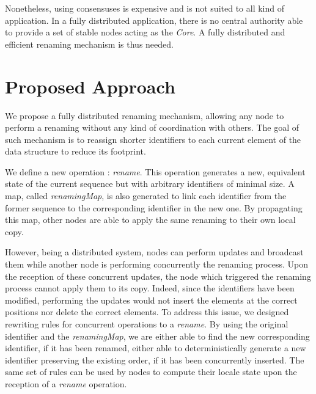 \documentclass[sigplan]{acmart}
\begin{document}
Nonetheless, using consensuses is expensive and is not suited to all kind of application. In a fully distributed application, there is no central authority able to provide a set of stable nodes acting as the \emph{Core}. A fully distributed and efficient renaming mechanism is thus needed.

\section{Proposed Approach}


We propose a fully distributed renaming mechanism, allowing any node to perform a renaming without any kind of coordination with others.
The goal of such mechanism is to reassign shorter identifiers to each current element of the data structure to reduce its footprint.

We define a new operation : \emph{rename}.
This operation generates a new, equivalent state of the current sequence but with arbitrary identifiers of minimal size.
A map, called \emph{renamingMap}, is also generated to link each identifier from the former sequence to the corresponding identifier in the new one.
By propagating this map, other nodes are able to apply the same renaming to their own local copy.

However, being a distributed system, nodes can perform updates and broadcast them while another node is performing concurrently the renaming process.
Upon the reception of these concurrent updates, the node which triggered the renaming process cannot apply them to its copy.
Indeed, since the identifiers have been modified, performing the updates would not insert the elements at the correct positions nor delete the correct elements.
To address this issue, we designed rewriting rules for concurrent operations to a \emph{rename}.
By using the original identifier and the \emph{renamingMap}, we are either able to find the new corresponding identifier, if it has been renamed, either able to deterministically generate a new identifier preserving the existing order, if it has been concurrently inserted.
The same set of rules can be used by nodes to compute their locale state upon the reception of a \emph{rename} operation.
\end{document}
